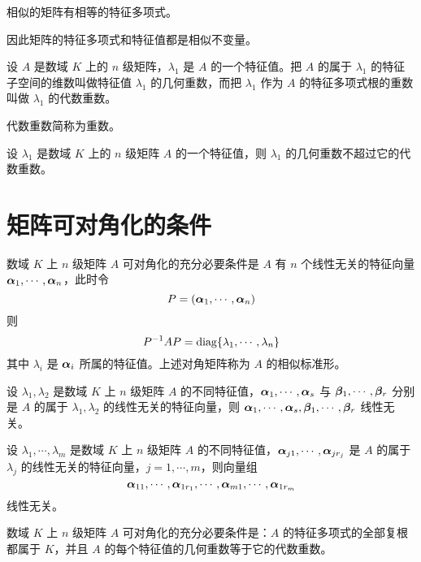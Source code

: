 \begin{theorem}
    相似的矩阵有相等的特征多项式。
\end{theorem}

因此矩阵的特征多项式和特征值都是相似不变量。

\begin{definition}
    设 $A$ 是数域 $K$ 上的 $n$ 级矩阵，$\lambda_1$ 是 $A$ 的一个特征值。把 $A$ 的属于 $\lambda_1$ 的特征子空间的维数叫做特征值 $\lambda_1$ 的几何重数，而把 $\lambda_1$ 作为 $A$ 的特征多项式根的重数叫做 $\lambda_1$ 的代数重数。
\end{definition}

代数重数简称为重数。

\begin{theorem}
    设 $\lambda_1$ 是数域 $K$ 上的 $n$ 级矩阵 $A$ 的一个特征值，则 $\lambda_1$ 的几何重数不超过它的代数重数。
\end{theorem}

\section{矩阵可对角化的条件}

\begin{theorem}
    数域 $K$ 上 $n$ 级矩阵 $A$ 可对角化的充分必要条件是 $A$ 有 $n$ 个线性无关的特征向量 $\boldsymbol{\alpha}_1,\cdots,\boldsymbol{\alpha}_n$，此时令
    $$P=(\boldsymbol{\alpha}_1,\cdots,\boldsymbol{\alpha}_n)$$
    则
    $$P^{-1}AP = \operatorname{diag}\{\lambda_1,\cdots,\lambda_n\}$$
    其中 $\lambda_i$ 是 $\boldsymbol{\alpha}_i$ 所属的特征值。上述对角矩阵称为 $A$ 的相似标准形。
\end{theorem}

\begin{theorem}
    设 $\lambda_1,\lambda_2$ 是数域 $K$ 上 $n$ 级矩阵 $A$ 的不同特征值，$\boldsymbol{\alpha}_1,\cdots,\boldsymbol{\alpha}_s$ 与 $\boldsymbol{\beta}_1,\cdots,\boldsymbol{\beta}_r$ 分别是 $A$ 的属于 $\lambda_1,\lambda_2$ 的线性无关的特征向量，则 $\boldsymbol{\alpha}_1,\cdots,\boldsymbol{\alpha}_s,\boldsymbol{\beta}_1,\cdots,\boldsymbol{\beta}_r$ 线性无关。
\end{theorem}

\begin{theorem}
    设 $\lambda_1,\cdots,\lambda_m$ 是数域 $K$ 上 $n$ 级矩阵 $A$ 的不同特征值，$\boldsymbol{\alpha}_{j1},\cdots,\boldsymbol{\alpha}_{jr_j}$ 是 $A$ 的属于 $\lambda_j$ 的线性无关的特征向量，$j=1,\cdots,m$，则向量组
    $$\boldsymbol{\alpha}_{11},\cdots,\boldsymbol{\alpha}_{1r_1},\cdots,\boldsymbol{\alpha}_{m1},\cdots,\boldsymbol{\alpha}_{1r_m}$$
    线性无关。
\end{theorem}

\begin{theorem}
    数域 $K$ 上 $n$ 级矩阵 $A$ 可对角化的充分必要条件是：$A$ 的特征多项式的全部复根都属于 $K$，并且 $A$ 的每个特征值的几何重数等于它的代数重数。
\end{theorem}

